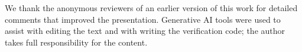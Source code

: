 We thank the anonymous reviewers of an earlier version of this work for detailed comments that improved the presentation.
Generative AI tools were used to assist with editing the text and with writing the verification code; the author takes full responsibility for the content.
